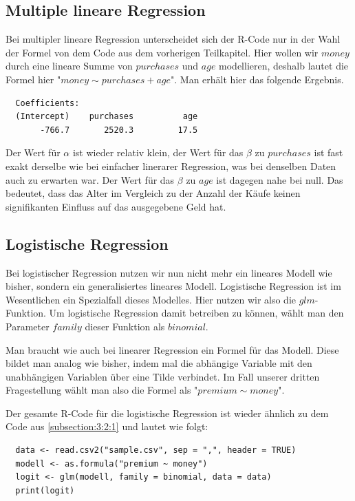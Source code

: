 \subsection{Multiple lineare Regression}
\label{subsection:3:2:3}

Bei multipler lineare Regression unterscheidet sich der R-Code nur in der Wahl der Formel von dem Code aus dem vorherigen Teilkapitel. Hier wollen wir $money$ durch eine lineare Summe von $purchases$ und $age$ modellieren, deshalb lautet die Formel hier "$money \sim purchases + age$". Man erhält hier das folgende Ergebnis.

\begin{verbatim}
  Coefficients:
  (Intercept)    purchases          age
       -766.7       2520.3         17.5
\end{verbatim}

Der Wert für $\alpha$ ist wieder relativ klein, der Wert für das $\beta$ zu $purchases$ ist fast exakt derselbe wie bei einfacher linerarer Regression, was bei denselben Daten auch zu erwarten war. Der Wert für das $\beta$ zu $age$ ist dagegen nahe bei null. Das bedeutet, dass das Alter im Vergleich zu der Anzahl der Käufe keinen signifikanten Einfluss auf das ausgegebene Geld hat.

\subsection{Logistische Regression}
\label{subsection:3:2:4}

Bei logistischer Regression nutzen wir nun nicht mehr ein lineares Modell wie bisher, sondern ein generalisiertes lineares Modell. Logistische Regression ist im Wesentlichen ein Spezialfall dieses Modelles. Hier nutzen wir also die $glm$-Funktion. Um logistische Regression damit betreiben zu können, wählt man den Parameter $family$ dieser Funktion als $binomial$.

Man braucht wie auch bei linearer Regression ein Formel für das Modell. Diese bildet man analog wie bisher, indem mal die abhängige Variable mit den unabhängigen Variablen über eine Tilde verbindet. Im Fall unserer dritten Fragestellung wählt man also die Formel als "$premium \sim money$".

Der gesamte R-Code für die logistische Regression ist wieder ähnlich zu dem Code aus \ref{subsection:3:2:1} und lautet wie folgt:

\begin{verbatim}
  data <- read.csv2("sample.csv", sep = ",", header = TRUE)
  modell <- as.formula("premium ~ money")
  logit <- glm(modell, family = binomial, data = data)
  print(logit)
\end{verbatim}

